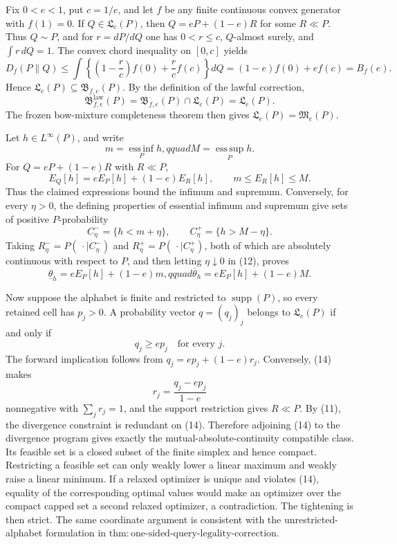 Fix \(0<e<1\), put \(c=1/e\), and let \(f\) be any finite continuous convex generator with \(f(1)=0\).  If \(Q\in\mathfrak L_e(P)\), then \(Q=eP+(1-e)R\) for some \(R\ll P\).  Thus \(Q\sim P\), and for \(r=dP/dQ\) one has \(0<r\le c\), \(Q\)-almost surely, and \(\int r\,dQ=1\).  The convex chord inequality on \([0,c]\) yields
\[
 D_f(P\|Q)
 \le\int\left\{\left(1-\frac rc\right)f(0)+\frac rc f(c)\right\}dQ
 =(1-e)f(0)+ef(c)=B_f(e). \tag{11}
\]
Hence \(\mathfrak L_e(P)\subseteq\mathfrak B_{f,e}(P)\).  By the definition of the lawful correction,
\[
 \mathfrak B^{\mathrm{law}}_{f,e}(P)
 =\mathfrak B_{f,e}(P)\cap\mathfrak L_e(P)
 =\mathfrak L_e(P).
\]
The frozen bow-mixture completeness theorem then gives \(\mathfrak L_e(P)=\mathfrak M_e(P)\).

Let \(h\in L^\infty(P)\), and write
\[
 m=\operatorname*{ess\,inf}_P h,qquad M=\operatorname*{ess\,sup}_P h.
\]
For \(Q=eP+(1-e)R\) with \(R\ll P\),
\[
 E_Q[h]=eE_P[h]+(1-e)E_R[h],\qquad m\le E_R[h]\le M. \tag{12}
\]
Thus the claimed expressions bound the infimum and supremum.  Conversely, for every \(\eta>0\), the defining properties of essential infimum and supremum give sets of positive \(P\)-probability
\[
 C^-_\eta=\{h<m+\eta\},\qquad C^+_\eta=\{h>M-\eta\}.
\]
Taking \(R^-_\eta=P(\,\cdot\mid C^-_\eta)\) and \(R^+_\eta=P(\,\cdot\mid C^+_\eta)\), both of which are absolutely continuous with respect to \(P\), and then letting \(\eta\downarrow0\) in (12), proves
\[
 \underline\theta_h=eE_P[h]+(1-e)m,qquad
 \overline\theta_h=eE_P[h]+(1-e)M. \tag{13}
\]

Now suppose the alphabet is finite and restricted to \(\operatorname{supp}(P)\), so every retained cell has \(p_j>0\).  A probability vector \(q=(q_j)_j\) belongs to \(\mathfrak L_e(P)\) if and only if
\[
 q_j\ge ep_j\quad\text{for every }j. \tag{14}
\]
The forward implication follows from \(q_j=ep_j+(1-e)r_j\).  Conversely, (14) makes
\[
 r_j=\frac{q_j-ep_j}{1-e}
\]
nonnegative with \(\sum_jr_j=1\), and the support restriction gives \(R\ll P\).  By (11), the divergence constraint is redundant on (14).  Therefore adjoining (14) to the divergence program gives exactly the mutual-absolute-continuity compatible class.  Its feasible set is a closed subset of the finite simplex and hence compact.  Restricting a feasible set can only weakly lower a linear maximum and weakly raise a linear minimum.  If a relaxed optimizer is unique and violates (14), equality of the corresponding optimal values would make an optimizer over the compact capped set a second relaxed optimizer, a contradiction.  The tightening is then strict.  The same coordinate argument is consistent with the unrestricted-alphabet formulation in \(\mathrm{thm:one\text{-}sided\text{-}query\text{-}legality\text{-}correction}\).

